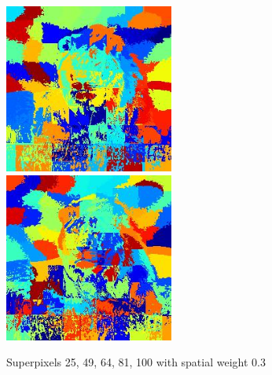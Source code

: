 \documentclass{article}
\begin{document}
\begin{figure}[h!]
	\includegraphics[height=15em]{code/outputs/prob1b_spatial_weight_0.3/prob1b_81.jpg}
	\includegraphics[height=15em]{code/outputs/prob1b_spatial_weight_0.3/prob1b_100.jpg}
	\caption{Superpixels 25, 49, 64, 81, 100 with spatial weight 0.3}
\end{figure}
\end{document}

